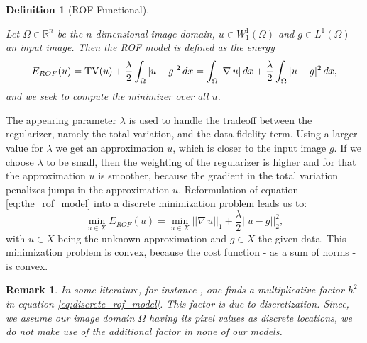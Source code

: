\documentclass{scrreprt}
\newtheorem{definition}[theorem]{Definition}
\newtheorem{remark}[theorem]{Remark}
\begin{document}
        \begin{definition}[ROF Functional] %
        \label{def:the_rof_functional}

            Let $\Omega \in \mathbb{R}^{n}$ be the $n$-dimensional image domain, $u \in W_{1}^{1}(\Omega)$ and $g \in L^{1}(\Omega)$ an input image. Then the ROF model is defined as the energy
                \begin{equation}
                    E_{ROF}(u) = \textnormal{TV}(u) + \frac{\lambda}{2} \int_{\Omega} |u - g|^{2} \, dx = \int_{\Omega} |\nabla \, u| \, dx + \frac{\lambda}{2} \int_{\Omega} |u - g|^{2} \, dx,
                    \label{eq:the_rof_model}
                \end{equation}
            and we seek to compute the minimizer over all $u$.

        \end{definition}

        The appearing parameter $\lambda$ is used to handle the tradeoff between the regularizer, namely the total variation, and the data fidelity term. Using a larger value for $\lambda$ we get an approximation $u$, which is closer to the input image $g$. If we choose $\lambda$ to be small, then the weighting of the regularizer is higher and for that the approximation $u$ is smoother, because the gradient in the total variation penalizes jumps in the approximation $u$. Reformulation of equation \ref{eq:the_rof_model} into a discrete minimization problem leads us to:
            \begin{equation}
                \min_{u \in X} E_{ROF}(u) = \min_{u \in X} ||\nabla \, u||_{1} + \frac{\lambda}{2} ||u - g||_{2}^{2},
            \label{eq:discrete_rof_model}
            \end{equation}
        with $u \in X$ being the unknown approximation and $g \in X$ the given data. This minimization problem is convex, because the cost function - as a sum of norms - is convex.

        \begin{remark} %
            In some literature, for instance \cite{Chambolle10afirst-order}, one finds a multiplicative factor $h^{2}$ in equation \ref{eq:discrete_rof_model}. This factor is due to discretization. Since, we assume our image domain $\Omega$ having its pixel values as discrete locations, we do not make use of the additional factor in none of our models.
        \end{remark}
\end{document}
